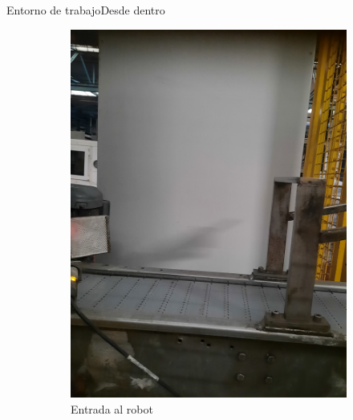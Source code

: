 \documentclass{beamer}
\begin{document}
\begin{frame}{Entorno de trabajo}{Desde dentro}
\begin{figure}
\begin{subfigure}[t]{0.3\textwidth}
  \includegraphics[width = \textwidth, angle=270]{img/closeup2}
  \caption{Entrada al robot}
  \label{fig:fin}
\end{subfigure}\hfill
\begin{subfigure}[t]{0.3\textwidth}
\centering

\end{subfigure}
\end{figure}
\end{frame}
\end{document}
